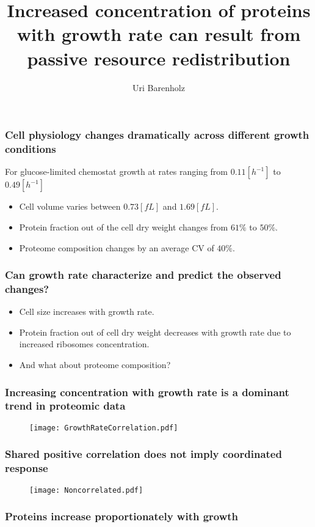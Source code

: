 \documentclass{beamer}
\title{Increased concentration of proteins with growth rate can result from passive resource redistribution}
\author{Uri Barenholz}
\begin{document}
\maketitle
\begin{frame}
\frametitle{Cell physiology changes dramatically across different growth conditions}
For glucose-limited chemostat growth at rates ranging from $0.11 [h^{-1}]$ to $0.49 [h^{-1}]$
\begin{itemize}
\item Cell volume varies between $0.73 [fL]$ and $1.69 [fL]$.
\item Protein fraction out of the cell dry weight changes from $61\%$ to $50\%$.
\item Proteome composition changes by an average CV of $40\%$.
\end{itemize}
\end{frame}

\begin{frame}
\frametitle{Can growth rate characterize and predict the observed changes?}
\begin{itemize}
\item Cell size increases with growth rate.
\item Protein fraction out of cell dry weight decreases with growth rate due to increased ribosomes concentration.
\item And what about proteome composition?
\end{itemize}
\end{frame}

\begin{frame}
\frametitle{Increasing concentration with growth rate is a dominant trend in proteomic data}
\begin{figure}[h!]
\centering
\texttt{[image: GrowthRateCorrelation.pdf]}
\end{figure}
\end{frame}

\begin{frame}
\frametitle{Shared positive correlation does not imply coordinated response}
\begin{figure}[h!]
\centering
\texttt{[image: Noncorrelated.pdf]}
\end{figure}
\end{frame}

\begin{frame}
\frametitle{Proteins increase proportionately with growth}
\end{frame}
\end{document}
